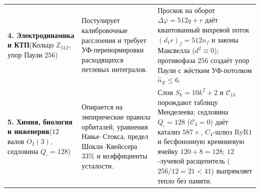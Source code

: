 \documentclass[11pt,a4paper]{article}
\theoremstyle{plain}
\theoremstyle{definition}
\begin{document}
\begin{table}[htbp]
\begin{tabular}{@{}p{}p{}p{}@{}}
\addlinespace[3pt]
\textbf{4. Электродинамика и КТП}\newline (Кольцо $\mathbb{Z}_{512}$, упор Паули $256$) &
Постулирует калибровочные расслоения и требует УФ-перенормировки расходящихся петлевых интегралов. &
Проскок на оборот $\Delta\varphi = 512 q + r$ даёт квантованный вихревой поток $(d_1 r)_f = 512 n_f$ и законы Максвелла ($d^2\equiv 0$); противофаза $256$ создаёт упор Паули с жёстким УФ-потолком $\hat{n}_E\le 6$. \\
\addlinespace[3pt]
\textbf{5. Химия, биология и инженерия}\newline ($12$ валов $O_2(3)$, седловина $Q_\square=128$) &
Опирается на эмпирические правила орбиталей, уравнения Навье--Стокса, предел Шокли--Квейссера $33\%$ и коэффициенты усталости. &
Слои $S_k=10k^2+2$ и $\mathcal{C}_{13}$ порождают таблицу Менделеева; седловина $Q_\square=128$ ($\mathcal{C}_3=0$) даёт катализ $587\times$, $C_4$-шлюз $\mathrm{RyR1}$ и бесфононную кремниевую ячейку $120+8=128$; $12$-лучевой расщепитель ($256/12=21<41$) выпрямляет тепло без памяти. \\
\bottomrule
\end{tabular}
\end{table}
\end{document}
